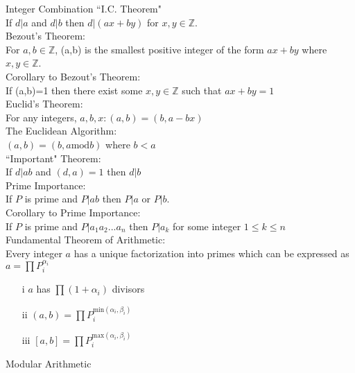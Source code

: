 \documentclass[12pt]{article}
\def \z{\mathbb{Z}}
\def \no{\noindent}
\begin{document}
\no  Integer Combination ``I.C. Theorem"\\
\hangindent=1cm If $d|a$ and $d|b$ then $d|(ax + by)$ for $x,y \in \z$.\\

\no  Bezout's Theorem:\\
\hangindent=1cm For $a,b \in \z$, (a,b) is the smallest positive integer of the form $ax+by$ where $x,y \in \z$.\\

\no Corollary to Bezout's Theorem:\\
\hangindent=1cm If (a,b)=1 then there exist some $x,y \in \z$ such that $ax + by = 1$\\

\no  Euclid's Theorem:\\
\hangindent=1cm For any integers, $a, b, x: (a, b) = (b, a - bx)$\\

\no The Euclidean Algorithm:\\
\hangindent=1cm $(a, b)=(b, a \text{mod} b)$ where $b<a$\\

\no  ``Important" Theorem:\\
\hangindent=1cm  If $d|ab$ and $(d,a) = 1$ then $d|b$\\

\no  Prime Importance:\\
\hangindent=1cm If $P$ is prime and $P|ab$ then $P|a$ or $P|b$.\\

\no Corollary to Prime Importance:\\
\hangindent=1cm If $P$ is prime and $P|a_1a_2...a_n$ then $P|a_k$ for some integer $1 \leq k \leq n$\\

\no  Fundamental Theorem of Arithmetic:\\
\hangindent=1cm Every integer $a$ has a unique factorization into primes which can be expressed as $a = \prod P_i^{\alpha_i}$
 \begin{itemize}
	\item[i] $a$ has $\prod (1+\alpha_i)$ divisors
	\item[ii] $ (a, b) = \prod P_i^{\text{min}(\alpha_i,\beta_i)}$
	\item[iii] $ [a,b] = \prod P_i^{\text{max}(\alpha_i,\beta_i)}$
\end{itemize}


\begin{center} Modular Arithmetic \end{center}
\end{document}
